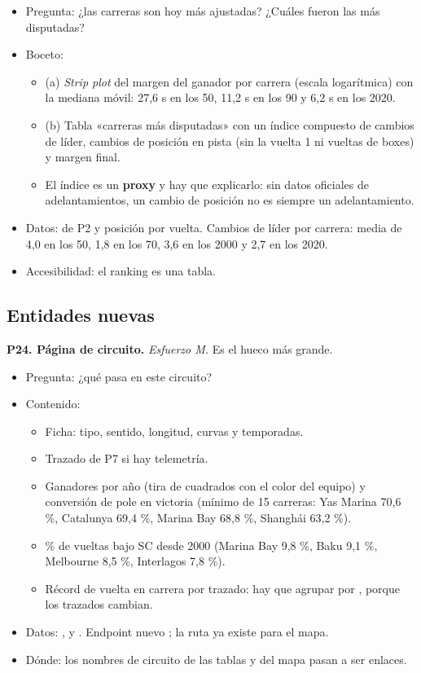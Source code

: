 \begin{itemize}
\item Pregunta: ¿las carreras son hoy más ajustadas? ¿Cuáles fueron las más disputadas?
\item Boceto:
\begin{itemize}
\item (a) \emph{Strip plot} del margen del ganador por carrera (escala logarítmica) con la mediana móvil: 27,6 s en los 50, 11,2 s en los 90 y 6,2 s en los 2020.
\item (b) Tabla «carreras más disputadas» con un índice compuesto de cambios de líder, cambios de posición en pista (sin la vuelta 1 ni vueltas de boxes) y margen final.
\item El índice es un \textbf{proxy} y hay que explicarlo: sin datos oficiales de adelantamientos, un cambio de posición no es siempre un adelantamiento.
\end{itemize}
\item Datos:  de P2 y posición por vuelta. Cambios de líder por carrera: media de 4,0 en los 50, 1,8 en los 70, 3,6 en los 2000 y 2,7 en los 2020.
\item Accesibilidad: el ranking es una tabla.
\end{itemize}

\subsection{Entidades nuevas}

\textbf{P24. Página de circuito.} \emph{Esfuerzo M.} Es el hueco más grande.

\begin{itemize}
\item Pregunta: ¿qué pasa en este circuito?
\item Contenido:
\begin{itemize}
\item Ficha: tipo, sentido, longitud, curvas y temporadas.
\item Trazado de P7 si hay telemetría.
\item Ganadores por año (tira de cuadrados con el color del equipo) y conversión de pole en victoria (mínimo de 15 carreras: Yas Marina 70,6 \%, Catalunya 69,4 \%, Marina Bay 68,8 \%, Shanghái 63,2 \%).
\item \% de vueltas bajo SC desde 2000 (Marina Bay 9,8 \%, Baku 9,1 \%, Melbourne 8,5 \%, Interlagos 7,8 \%).
\item Récord de vuelta en carrera por trazado: hay que agrupar por , porque los trazados cambian.
\end{itemize}
\item Datos: ,  y . Endpoint nuevo ; la ruta  ya existe para el mapa.
\item Dónde: los nombres de circuito de las tablas y del mapa pasan a ser enlaces.
\end{itemize}

